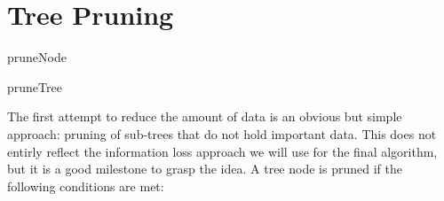 \section{Tree Pruning}
\label{sec:algorithm:pruning}

\begin{algorithm}


    \caption{pruneNode}
    \label{algo:pruneNode}
\end{algorithm}

\begin{algorithm}



    \caption{pruneTree}
    \label{algo:pruneTree}
\end{algorithm}

The first attempt to reduce the amount of data is an obvious but simple approach: pruning of sub-trees that do not hold important data. This does not entirly reflect the information loss approach we will use for the final algorithm, but it is a good milestone to grasp the idea. A tree node is pruned if the following conditions are met:

